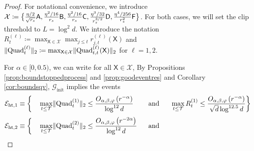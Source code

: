 \begin{proof}
For notational convenience, we introduce $\mathcal{X} \coloneqq \big \{  \tfrac{\eta/2}{\sqrt{r_s}} \mathsf{A},    \tfrac{\eta^2/16}{r_s} \mathsf{B},    \tfrac{\eta^2/16}{r_s} \mathsf{C},    \tfrac{\eta^3/32}{r_s^{3/2}} \mathsf{D},  \tfrac{\eta^4/256}{r_s^2}  \mathsf{F} \big \}$.  For both cases, we will set the clip threshold to $L = \log^2 d$.  We introduce the notation  $R_{t}^{(\ell)} \coloneqq \max_{\mathsf{X} \in\mathcal{X} } \max_{j \leq t} r_{j,t}^{(\ell)}( \mathsf{X})$ and  $\lVert \text{Quad}^{(\ell)}_{t}  \rVert_2 \coloneqq \max_{\mathsf{X} \in\mathcal{X} }  \lVert\text{Quad}^{(\ell)}_{t,t}(\mathsf{X}) \rVert_2$ for $\ell = 1,2$.


\smallskip
For $\alpha \in [0,0.5)$, we can write for all $\mathsf{X} \in \mathcal{X} $,
By Propositions \ref{prop:boundstoppedprocess} and \ref{prop:goodeventres} and Corollary \ref{cor:boundsqv},  $\mathcal{G}_{\text{init}}$ implies the events
\begin{alignat}{4}
& \mathcal{E}_{\mathrm{ht},1} \equiv \bigg \lbrace &&\max_{t \leq \mathcal{T}}  \norm{ \text{Quad}^{(1)}_{t}}_2 \leq \frac{O_{\alpha,\beta, \varphi} \left( r^{- \alpha} \right)}{\log^{12} d} ~~&& \text{and} ~~   
&&\max_{t \leq \mathcal{T}}  R_{t}^{(1)}   \leq  \frac{O_{\alpha,\beta, \varphi} \left( r^{- \alpha} \right)}{\sqrt{d} \log^{12.5} d}  \bigg \rbrace     \\[0.25em]
&  \mathcal{E}_{\mathrm{ht},2} \equiv \bigg \lbrace && \max_{t \leq \mathcal{T}}  \norm{ \text{Quad}^{(2)}_{t}}_2 \leq \frac{O_{\alpha,\beta, \varphi} \left( r^{- 2\alpha} \right)}{\log^{12} d} ~~&& \text{and} ~~ 

\end{alignat}
\end{proof}
